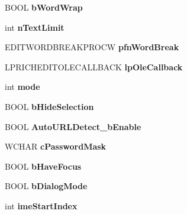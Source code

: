 \begin{DoxyCompactItemize}
B\+O\+OL {\bfseries b\+Word\+Wrap}
\item 
\mbox{\label{structtag_m_e___text_editor_ae7e9a80e2462bc01a5fab0a4c25a04a2}} 
int {\bfseries n\+Text\+Limit}
\item 
\mbox{\label{structtag_m_e___text_editor_a144755a9ed252907eabb53ab965affea}} 
E\+D\+I\+T\+W\+O\+R\+D\+B\+R\+E\+A\+K\+P\+R\+O\+CW {\bfseries pfn\+Word\+Break}
\item 
\mbox{\label{structtag_m_e___text_editor_aa59e6ca04137409b0e917f615ee61a75}} 
L\+P\+R\+I\+C\+H\+E\+D\+I\+T\+O\+L\+E\+C\+A\+L\+L\+B\+A\+CK {\bfseries lp\+Ole\+Callback}
\item 
\mbox{\label{structtag_m_e___text_editor_a65ce78cb88aa605d8963ddde18c900b7}} 
int {\bfseries mode}
\item 
\mbox{\label{structtag_m_e___text_editor_af78c37d2554efc0551649cac8b5acfd4}} 
B\+O\+OL {\bfseries b\+Hide\+Selection}
\item 
\mbox{\label{structtag_m_e___text_editor_a92bf597a3324d7c9f5cff83319215fdb}} 
B\+O\+OL {\bfseries Auto\+U\+R\+L\+Detect\+\_\+b\+Enable}
\item 
\mbox{\label{structtag_m_e___text_editor_a0ba322718f41072bea1c3249946fd53a}} 
W\+C\+H\+AR {\bfseries c\+Password\+Mask}
\item 
\mbox{\label{structtag_m_e___text_editor_aedf770ccfdf78d7677455f3af29335bd}} 
B\+O\+OL {\bfseries b\+Have\+Focus}
\item 
\mbox{\label{structtag_m_e___text_editor_a338d439b9471ca0eb86ea7854ef059d1}} 
B\+O\+OL {\bfseries b\+Dialog\+Mode}
\item 
\mbox{\label{structtag_m_e___text_editor_af18c4732b3b1c689227c3fa13ac70921}} 
int {\bfseries ime\+Start\+Index}
\item 
\mbox{\label{structtag_m_e___text_editor_a45b6b894f457703227fbf49bf1c96942}} 

\end{DoxyCompactItemize}
